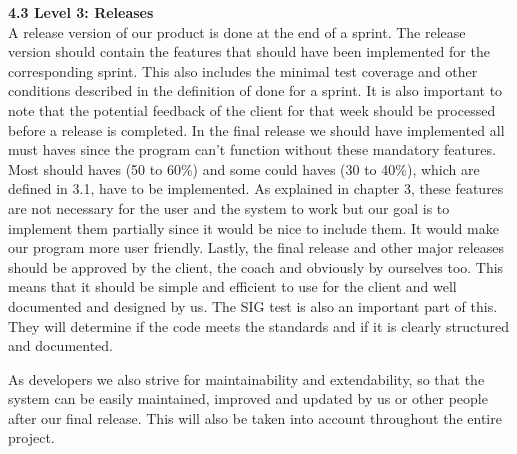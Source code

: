\textbf{4.3 Level 3: Releases}\\
A release version of our product is done at the end of a sprint. The release version should contain the features that should have been implemented for the corresponding sprint. This also includes the minimal test coverage and other conditions described in the definition of done for a sprint. It is also important to note that the potential feedback of the client for that week should be processed before a release is completed.
In the final release we should have implemented all must haves since the program can't function without these mandatory features. Most should haves (50 to 60\%) and some could haves (30 to 40\%), which are defined in 3.1, have to be implemented. As explained in chapter 3, these features are not necessary for the user and the system to work but our goal is to implement them partially since it would be nice to include them. It would make our program more user friendly. 
Lastly, the final release and other major releases should be approved by the client, the coach and obviously by ourselves too. This means that it should be simple and efficient to use for the client and well documented and designed by us. The SIG test is also an important part of this. They will determine if the code meets the standards and if it is clearly structured and documented. 

As developers we also strive for maintainability and extendability, so that the system can be easily maintained, improved and updated by us or other people after our final release. This will also be taken into account throughout the entire project.

